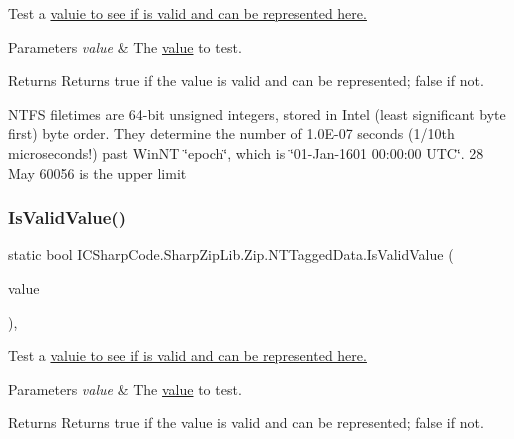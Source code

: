 Test a \hyperlink{}{valuie to see if is valid and can be represented here.} 


\begin{DoxyParams}{Parameters}
{\em value} & The \hyperlink{}{value} to test.\\
\hline
\end{DoxyParams}
\begin{DoxyReturn}{Returns}
Returns true if the value is valid and can be represented; false if not.
\end{DoxyReturn}


N\+T\+FS filetimes are 64-\/bit unsigned integers, stored in Intel (least significant byte first) byte order. They determine the number of 1.\+0E-\/07 seconds (1/10th microseconds!) past Win\+NT \char`\"{}epoch\char`\"{}, which is \char`\"{}01-\/\+Jan-\/1601 00\+:00\+:00 U\+T\+C\char`\"{}. 28 May 60056 is the upper limit \mbox{\label{class_i_c_sharp_code_1_1_sharp_zip_lib_1_1_zip_1_1_n_t_tagged_data_ae4fe23410bbadf234c3ba5bcb888dcf0}} 
\subsubsection{\texorpdfstring{Is\+Valid\+Value()}{IsValidValue()}\hspace{0.1cm}{\footnotesize\ttfamily [2/2]}}
{\footnotesize\ttfamily static bool I\+C\+Sharp\+Code.\+Sharp\+Zip\+Lib.\+Zip.\+N\+T\+Tagged\+Data.\+Is\+Valid\+Value (\begin{DoxyParamCaption}\item[{Date\+Time}]{value }\end{DoxyParamCaption})\hspace{0.3cm}{\ttfamily [inline]}, {\ttfamily [static]}}



Test a \hyperlink{}{valuie to see if is valid and can be represented here.} 


\begin{DoxyParams}{Parameters}
{\em value} & The \hyperlink{}{value} to test.\\
\hline
\end{DoxyParams}
\begin{DoxyReturn}{Returns}
Returns true if the value is valid and can be represented; false if not.
\end{DoxyReturn}


